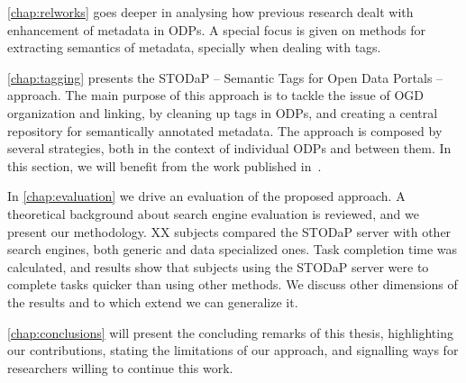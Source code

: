 \autoref{chap:relworks} goes deeper in analysing how previous research dealt with enhancement of metadata in ODPs.
A special focus is given on methods for extracting semantics of metadata, specially when dealing with tags.

\autoref{chap:tagging} presents the STODaP -- Semantic Tags for Open Data Portals -- approach.
The main purpose of this approach is to tackle the issue of OGD organization and linking, by cleaning up tags in ODPs, and creating a central repository for semantically annotated metadata.
The approach is composed by several strategies, both in the context of individual ODPs and between them.
In this section, we will benefit from the work published in~.

In \autoref{chap:evaluation} we drive an evaluation of the proposed approach.
A theoretical background about search engine evaluation is reviewed, and we present our methodology.
XX subjects compared the STODaP server with other search engines, both generic and data specialized ones.
Task completion time was calculated, and results show that subjects using the STODaP server were to complete tasks quicker than using other methods.
We discuss other dimensions of the results and to which extend we can generalize it.

\autoref{chap:conclusions} will present the concluding remarks of this thesis, highlighting our contributions, stating the limitations of our approach, and signalling ways for researchers willing to continue this work.
